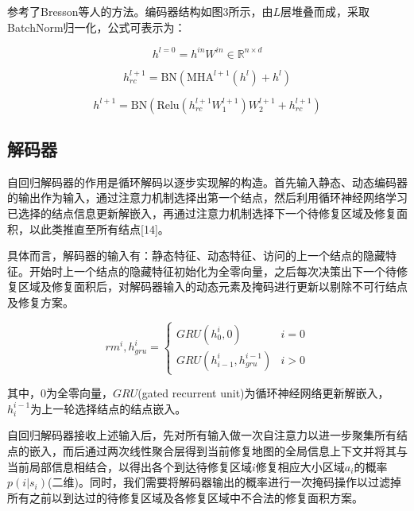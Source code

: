 \documentclass[AutoFakeBold]{LZUThesis}
\begin{document}
参考了Bresson\cite{bresson2021transformer}等人的方法。编码器结构如图3所示，由$L$层堆叠而成，采取BatchNorm归一化，公式可表示为：

\begin{equation}
	h^{l=0} = h^{in} W^{in} \in \mathbb{R}^{n \times d}
	\label{eq:13a}
\end{equation}

\begin{equation}
	h_{rc}^{l+1} = \text{BN}\left(\text{MHA}^{l+1}(h^l) + h^l\right)
	\label{eq:13b}
\end{equation}

\begin{equation}
	h^{l+1} = \text{BN}\left(\text{Relu}\left(h_{rc}^{l+1} W_1^{l+1}\right) W_2^{l+1} + h_{rc}^{l+1}\right)
	\label{eq:13c}
\end{equation}

\subsection{解码器}

自回归解码器的作用是循环解码以逐步实现解的构造。首先输入静态、动态编码器的输出作为输入，通过注意力机制选择出第一个结点，然后利用循环神经网络学习已选择的结点信息更新解嵌入，再通过注意力机制选择下一个待修复区域及修复面积，以此类推直至所有结点[14]。

具体而言，解码器的输入有：静态特征、动态特征、访问的上一个结点的隐藏特征。开始时上一个结点的隐藏特征初始化为全零向量，之后每次决策出下一个待修复区域及修复面积后，对解码器输入的动态元素及掩码进行更新以剔除不可行结点及修复方案。

\begin{equation}
	rm^{i}, h_{gru}^{i} =
	\left\{
	\begin{array}{ll}
		GRU(h_{0}^{i}, 0)               & i = 0 \\
		GRU(h_{i-1}^{i}, h_{gru}^{i-1}) & i > 0
	\end{array}
	\right.
	\label{eq:14}
\end{equation}

其中，$0$为全零向量，$GRU$(gated recurrent unit)为循环神经网络更新解嵌入，$h_i^{i-1}$为上一轮选择结点的结点嵌入。

自回归解码器接收上述输入后，先对所有输入做一次自注意力以进一步聚集所有结点的嵌入，而后通过两次线性聚合层得到当前修复地图的全局信息上下文并将其与当前局部信息相结合，以得出各个到达待修复区域$i$修复相应大小区域$a_i$的概率$p(i|s_i)$(二维)。同时，我们需要将解码器输出的概率进行一次掩码操作以过滤掉所有之前以到达过的待修复区域及各修复区域中不合法的修复面积方案。
\end{document}
